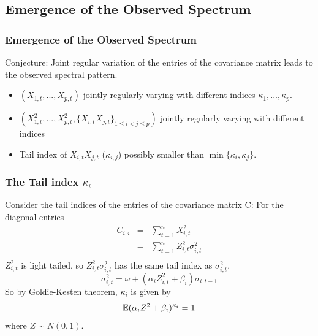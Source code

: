 \documentclass{beamer}
\begin{document}
\subsection{Emergence of the Observed Spectrum}
\begin{frame}
  \frametitle{Emergence of the Observed Spectrum}
  Conjecture: Joint regular variation of the entries of the covariance
  matrix leads to the observed spectral pattern.
  \begin{itemize}
  \item $(X_{1,t}, ..., X_{p,t})$ jointly regularly varying with
    different indices $\kappa_1, ..., \kappa_p$.
  \item $(X_{1,t}^2, ..., X_{p,t}^2, \{X_{i,t}X_{j,t}\}_{1 \leq i < j
      \leq p})$ jointly regularly varying with different indices
  \item Tail index of $X_{i,t} X_{j,t}$ ($\kappa_{i,j}$) possibly
    smaller than $\min\{\kappa_i, \kappa_j\}$.
  \end{itemize}
\end{frame}

\begin{frame}
  \frametitle{The Tail index $\kappa_i$}
  Consider the tail indices of the entries of the covariance matrix C:
  For the diagonal entries
    \begin{eqnarray*}
      C_{i, i} &=& \sum_{t=1}^n X_{i, t}^2 \\
               &=& \sum_{t=1}^n Z_{i, t}^2 \sigma_{i, t}^2 \\
    \end{eqnarray*}
    $Z_{i, t}^2$ is light tailed, so $Z_{i, t}^2 \sigma_{i, t}^2$ has
    the same tail index as $\sigma_{i, t}^2$.
    \[
    \sigma_{i, t}^2 = \omega + (\alpha_i Z_{i,t}^2 + \beta_i)\sigma_{i,t-1}
    \]
    So by Goldie-Kesten theorem, $\kappa_i$ is given by
    \[
    \mathbb{E} (\alpha_i Z^2 + \beta_i)^{\kappa_i} = 1
    \]
    where $Z \sim N(0, 1)$.
  \end{frame}
\end{document}
